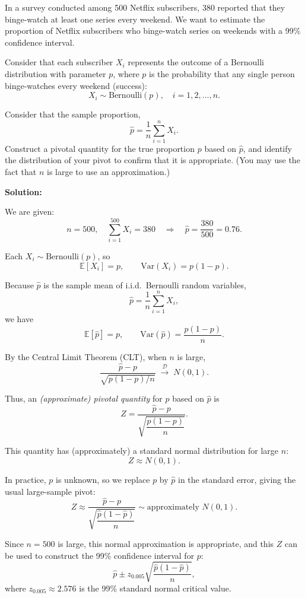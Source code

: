 \documentclass[11pt,letterpaper]{article}
\theoremstyle{remark}
\begin{document}
In a survey conducted among 500 Netflix subscribers, 380 reported that they binge-watch at least one
series every weekend. We want to estimate the proportion of Netflix subscribers who binge-watch series on
weekends with a 99\% confidence interval.

Consider that each subscriber $X_i$ represents the outcome of a Bernoulli distribution with parameter $p$,
where $p$ is the probability that any single person binge-watches every weekend (success):
\[
X_i \sim \text{Bernoulli}(p), \quad i = 1,2,\dots,n.
\]

Consider that the sample proportion,
\[
\hat{p} = \frac{1}{n} \sum_{i=1}^n X_i.
\]
Construct a pivotal quantity for the true proportion $p$ based on $\hat{p}$, and identify the distribution of your pivot to confirm that it is appropriate. (You may use the fact that $n$ is large to use an approximation.)

\vspace{1cm}

\textbf{Solution:}

We are given:
\[
n = 500, \quad \sum_{i=1}^{500} X_i = 380 \quad \Rightarrow \quad \hat{p} = \frac{380}{500} = 0.76.
\]

Each $X_i \sim \text{Bernoulli}(p)$, so
\[
\mathbb{E}[X_i] = p, \qquad \mathrm{Var}(X_i) = p(1-p).
\]

Because $\hat{p}$ is the sample mean of i.i.d.\ Bernoulli random variables,
\[
\hat{p} = \frac{1}{n} \sum_{i=1}^n X_i,
\]
we have
\[
\mathbb{E}[\hat{p}] = p,
\qquad
\mathrm{Var}(\hat{p}) = \frac{p(1-p)}{n}.
\]

By the Central Limit Theorem (CLT), when $n$ is large,
\[
\frac{\hat{p} - p}{\sqrt{p(1-p)/n}} \;\xrightarrow[]{\ \mathcal{D}\ }\; N(0,1).
\]

Thus, an \emph{(approximate) pivotal quantity} for $p$ based on $\hat{p}$ is
\[
\boxed{Z = \frac{\hat{p} - p}{\sqrt{\dfrac{p(1-p)}{n}}}.}
\]

This quantity has (approximately) a standard normal distribution for large $n$:
\[
\boxed{Z \approx N(0,1).}
\]

In practice, $p$ is unknown, so we replace $p$ by $\hat{p}$ in the standard error, giving the usual large-sample pivot:
\[
Z \approx \frac{\hat{p} - p}{\sqrt{\dfrac{\hat{p}(1-\hat{p})}{n}}} \sim \text{approximately } N(0,1).
\]

Since $n = 500$ is large, this normal approximation is appropriate, and this $Z$ can be used to construct the 99\% confidence interval for $p$:
\[
\hat{p} \pm z_{0.005} \sqrt{\frac{\hat{p}(1-\hat{p})}{n}},
\]
where $z_{0.005} \approx 2.576$ is the 99\% standard normal critical value.
\end{document}
